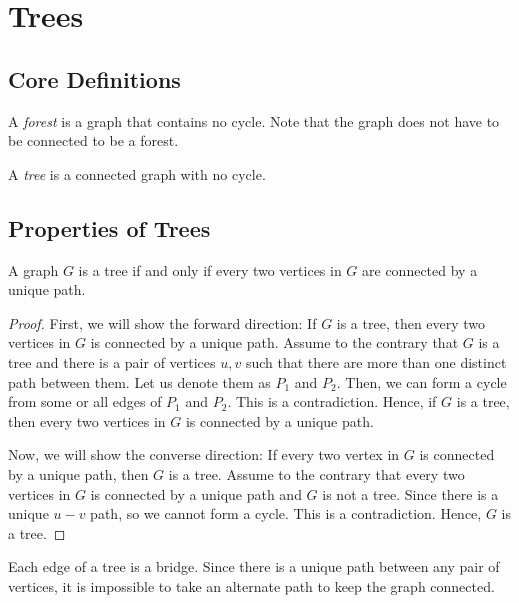 \chapter{Trees}

\section{Core Definitions}

\begin{definition}[Forests]
  A \textit{forest} is a graph that contains no cycle. Note that the graph 
  does not have to be connected to be a forest.
\end{definition}

\begin{definition}[Trees]
  A \textit{tree} is a connected graph with no cycle.
\end{definition}

\section{Properties of Trees}

\begin{theorem}
  A graph \(G\) is a tree if and only if every two vertices in \(G\) are
  connected by a unique path.
\end{theorem}

\begin{proof}
  First, we will show the forward direction: If \(G\) is a tree, then every two
  vertices in \(G\) is connected by a unique path. Assume to the contrary that
  \(G\) is a tree and there is a pair of vertices \(u, v\) such that there are 
  more than one distinct path between them. Let us denote them as \(P_1\) and
  \(P_2\). Then, we can form a cycle from some or all edges of \(P_1\) and 
  \(P_2\). This is a contradiction. Hence, if \(G\) is a tree, then every two
  vertices in \(G\) is connected by a unique path.

  Now, we will show the converse direction: If every two vertex in \(G\) is
  connected by a unique path, then \(G\) is a tree. Assume to the contrary that
  every two vertices in \(G\) is connected by a unique path and \(G\) is not a
  tree. Since there is a unique \(u-v\) path, so we cannot form a cycle. This is
  a contradiction. Hence, \(G\) is a tree.
\end{proof}

\begin{remark}
  Each edge of a tree is a bridge. Since there is a unique path between any pair
  of vertices, it is impossible to take an alternate path to keep the graph
  connected.
\end{remark}

